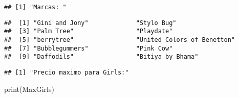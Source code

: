 \documentclass[
]{article}
\newenvironment{Shaded}{\begin{snugshade}}{\end{snugshade}}
\newcommand{\FunctionTok}[1]{\textcolor[rgb]{0.00,0.00,0.00}{#1}}
\newcommand{\NormalTok}[1]{#1}
\newcommand{\OtherTok}[1]{\textcolor[rgb]{0.56,0.35,0.01}{#1}}
\newcommand{\SpecialCharTok}[1]{\textcolor[rgb]{0.00,0.00,0.00}{#1}}
\newcommand{\StringTok}[1]{\textcolor[rgb]{0.31,0.60,0.02}{#1}}
\begin{document}
\begin{Shaded}
\end{Shaded}

\begin{verbatim}
## [1] "Marcas: "
\end{verbatim}

\begin{Shaded}
\end{Shaded}

\begin{verbatim}
##  [1] "Gini and Jony"             "Stylo Bug"                
##  [3] "Palm Tree"                 "Playdate"                 
##  [5] "berrytree"                 "United Colors of Benetton"
##  [7] "Bubblegummers"             "Pink Cow"                 
##  [9] "Daffodils"                 "Bitiya by Bhama"
\end{verbatim}

\begin{Shaded}
\end{Shaded}

\begin{verbatim}
## [1] "Precio maximo para Girls:"
\end{verbatim}

\begin{Shaded}
\begin{Highlighting}[]
\FunctionTok{print}\NormalTok{(MaxGirls)}
\end{Highlighting}
\end{Shaded}
\end{document}
